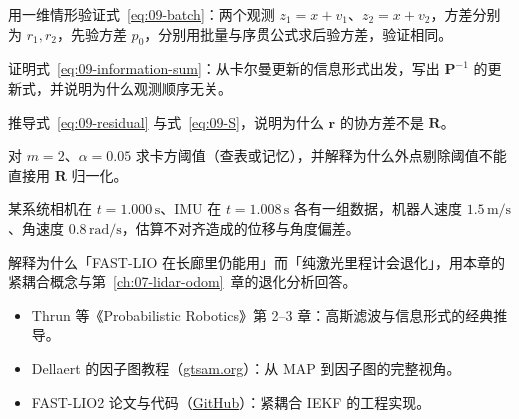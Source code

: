 \begin{problemset}

  \item 用一维情形验证式~\eqref{eq:09-batch}：两个观测 $z_1=x+v_1$、$z_2=x+v_2$，方差分别为 $r_1,r_2$，先验方差 $p_0$，分别用批量与序贯公式求后验方差，验证相同。
  \item 证明式~\eqref{eq:09-information-sum}：从卡尔曼更新的信息形式出发，写出 $\bm{P}^{-1}$ 的更新式，并说明为什么观测顺序无关。
  \item 推导式~\eqref{eq:09-residual} 与式~\eqref{eq:09-S}，说明为什么 $\bm{r}$ 的协方差不是 $\bm{R}$。
  \item 对 $m=2$、$\alpha=0.05$ 求卡方阈值（查表或记忆），并解释为什么外点剔除阈值不能直接用 $\bm{R}$ 归一化。
  \item 某系统相机在 $t=1.000\,\mathrm{s}$、IMU 在 $t=1.008\,\mathrm{s}$ 各有一组数据，机器人速度 $1.5\,\mathrm{m/s}$、角速度 $0.8\,\mathrm{rad/s}$，估算不对齐造成的位移与角度偏差。
  \item 解释为什么「FAST-LIO 在长廊里仍能用」而「纯激光里程计会退化」，用本章的紧耦合概念与第~\ref{ch:07-lidar-odom}~章的退化分析回答。
\end{problemset}

\begin{reading}

\begin{itemize}
  \item Thrun 等《Probabilistic Robotics》第 2--3 章：高斯滤波与信息形式的经典推导。
  \item Dellaert 的因子图教程（\href{https://gtsam.org/}{gtsam.org}）：从 MAP 到因子图的完整视角。
  \item FAST-LIO2 论文与代码（\href{https://github.com/hku-mars/FAST_LIO}{GitHub}）：紧耦合 IEKF 的工程实现。
\end{itemize}


\end{reading}
